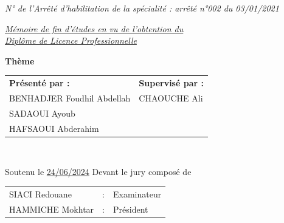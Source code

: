 \documentclass[12pt,a4paper,final]{report}
\begin{document}
\begin{titlepage}
\begin{center}
    {\small \textit{N° de l'Arrêté d'habilitation de la spécialité : arrêté n°002 du 03/01/2021}} \\
    \vspace{0.7cm}
    
    {\large \textit{\underline{Mémoire de fin d'études en vu de l'obtention du}}} \\
    {\large \textit{\underline{Diplôme de Licence Professionnelle}}} \\
    \vspace{0.7cm}
    
    {\LARGE \textbf{Thème}} \\
    \vspace{0.6cm}
    
    \vspace{0.8cm}

    \begin{tabular}{p{8cm}p{6cm}}
        \textbf{Présenté par :} & \textbf{Supervisé par :} \\
        BENHADJER Foudhil Abdellah & CHAOUCHE Ali \\
        SADAOUI Ayoub & \\
        HAFSAOUI Abderahim & \\
    \end{tabular} \\
    \vspace{0.8cm}
    
    {\normalsize Soutenu le \underline{24/06/2024} Devant le jury composé de} \\
    \vspace{0.4cm}
    \begin{tabular}{lll}
        SIACI Redouane & : & Examinateur \\
        HAMMICHE Mokhtar & : & Président \\
    \end{tabular}
\end{center}
\end{titlepage}
\end{document}

